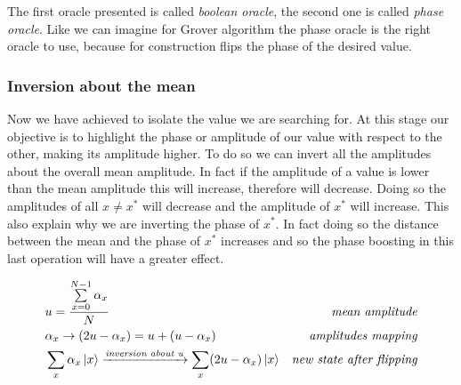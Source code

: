 \documentclass[main.tex]{subfiles}
\theoremstyle{definition}
\begin{document}
The first oracle presented is called \textit{boolean oracle}, the second one is called \textit{phase oracle}. Like we can imagine for Grover algorithm the phase oracle is the right oracle to use, because for construction flips the phase of the desired value.

\subsubsection{Inversion about the mean}
Now we have achieved to isolate the value we are searching for. At this stage our objective is to highlight the phase or amplitude of our value with respect to the other, making its amplitude
higher. To do so we can invert all the amplitudes about the overall mean amplitude. In fact if the amplitude of a value is lower than the mean amplitude this will increase, therefore will decrease. Doing so the amplitudes of all $x\neq x^*$ will decrease and the amplitude of $x^*$ will increase. This also explain why we are inverting the phase of $x^*$. In fact doing so the distance between the mean and the phase of $x^*$ increases and so the phase boosting in this last operation will have a greater effect.

\begin{align*}
& u=\frac{\sum\limits_{x=0}^{N-1}\alpha_x}{N}  &\textit{mean amplitude}\\
& \alpha_x \rightarrow (2u-\alpha_x)=u+(u-\alpha_x) &\textit{amplitudes mapping}\\
& \sum_{x}\alpha_{x}\ket{x} \xrightarrow{\textit{inversion about u}} \sum_{x}(2u-\alpha_x)\ket{x} &\textit{new state after flipping}
\end{align*}
\end{document}
